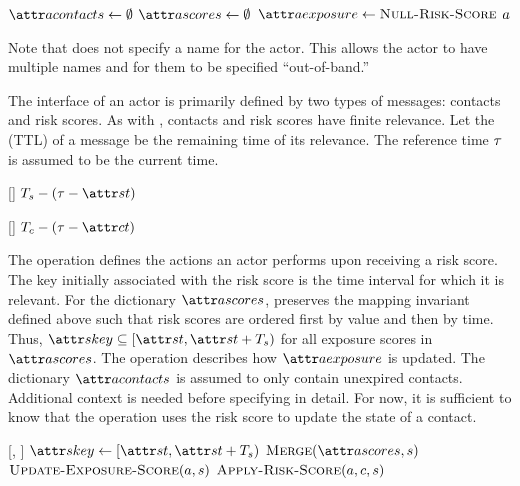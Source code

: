 \begin{function}{\nCreateActor}
  \State $\aActorContacts \assign \emptyset$
  \State $\aActorScores \assign \emptyset$
  \State $\aActorExposure \assign \cNullRiskScore$
  \State \Return $a$
\end{function}

Note that \cCreateActor{} does not specify a name for the actor. This allows the actor to have multiple names and for them to be specified ``out-of-band.''

The interface of an actor is primarily defined by two types of messages: contacts and risk scores. As with , contacts and risk scores have finite relevance. Let the  (TTL) of a message be the remaining time of its relevance. The reference time $\tau$ is assumed to be the current time.

\begin{function}{\nRiskScoreTtl}[\vScore]
  \State \Return $\pScoreExpiry - (\vRefTime - \aScoreTime)$
\end{function}

\begin{function}{\nContactTtl}[\vContact]
  \State \Return $\pContactExpiry - (\vRefTime - \aContactTime)$
\end{function}

The \cHandleRiskScore{} operation defines the actions an actor performs upon receiving a risk score. The key initially associated with the risk score is the time interval for which it is relevant. For the dictionary $\aActorScores$, \cMerge{} preserves the mapping invariant defined above such that risk scores are ordered first by value and then by time. Thus, $\aScoreKey \subseteq [\aScoreTime, \aScoreTime + \pScoreExpiry)$ for all exposure scores in $\aActorScores$. The \cUpdateExposureScore{} operation describes how $\aActorExposure$ is updated. The dictionary $\aActorContacts$ is assumed to only contain unexpired contacts. Additional context is needed before specifying \cApplyRiskScore{} in detail. For now, it is sufficient to know that the operation uses the risk score to update the state of a contact.

\begin{function}[H]{\nHandleRiskScore}[\vActor, \vScore]
    \State $\aScoreKey \assign [\aScoreTime, \aScoreTime + \pScoreExpiry)$
    \State $\cMerge[\aActorScores, \vScore]$
    \State $\cUpdateExposureScore[\vActor, \vScore]$
    \ForEach{$\vContact \in \aActorContacts$}
      \State $\cApplyRiskScore[\vActor, \vContact, \vScore]$
    \EndFor
  \EndIf
\end{function}

